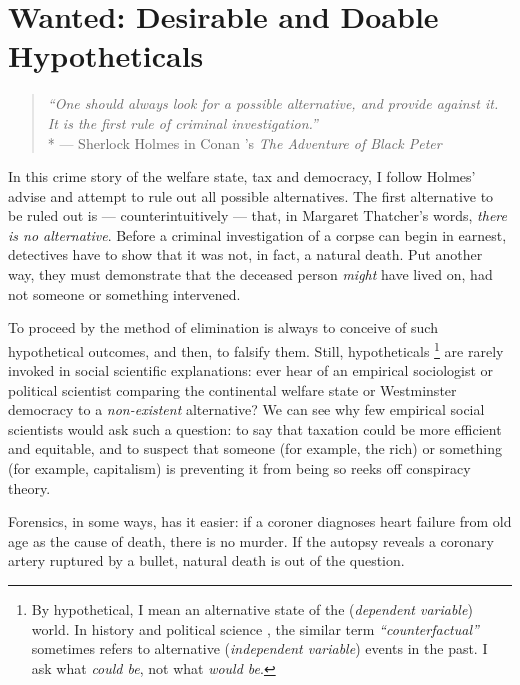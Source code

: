 
\chapter[Wanted]{Wanted: Desirable and Doable Hypotheticals} \label{chap:wanted}
	
\begin{quote}
	\emph{``One should always look for a possible alternative, and provide against it. It is the first rule of criminal investigation.''}\\*
	--- Sherlock Holmes in Conan \citeauthor{Doyle1904}'s \emph{The Adventure of Black Peter} \citeyearpar[567]{Doyle1904}
\end{quote}

In this crime story of the welfare state, tax and democracy, I follow Holmes' advise and attempt to rule out all possible alternatives. 
The first alternative to be ruled out is --- counterintuitively --- that, in Margaret Thatcher's words, \emph{there is no alternative}. 
Before a criminal investigation of a corpse can begin in earnest, detectives have to show that it was not, in fact, a natural death. 
Put another way, they must demonstrate that the deceased person \emph{might} have lived on, had not someone or something intervened. 

To proceed by the method of elimination is always to conceive of such hypothetical outcomes, and then, to falsify them. Still, hypotheticals
\footnote{
	By hypothetical, I mean an alternative state of the (\emph{dependent variable}) world. 
	In history \citep[recently reviewed by][]{Bunzl2004} and political science \citep[for a methodological appraisal, see][]{Fearon1991}, the similar term \emph{``counterfactual''} sometimes refers to alternative (\emph{independent variable}) events in the past. I ask what \emph{could be}, not what \emph{would be}.
}
are rarely invoked in social scientific explanations: ever hear of an empirical sociologist or political scientist comparing the continental welfare state \citep{Esping-Andersen-1990-aa} or Westminster democracy \citep{Lijphart-1999-aa} to a \emph{non-existent} alternative? 
We can see why few empirical social scientists would ask such a question: to say that taxation could be more efficient and equitable, and to suspect that someone (for example, the rich) or something (for example, capitalism) is preventing it from being so reeks off conspiracy theory. 

Forensics, in some ways, has it easier: if a coroner diagnoses heart failure from old age as the cause of death, there is no murder. 
If the autopsy reveals a coronary artery ruptured by a bullet, natural death is out of the question.

